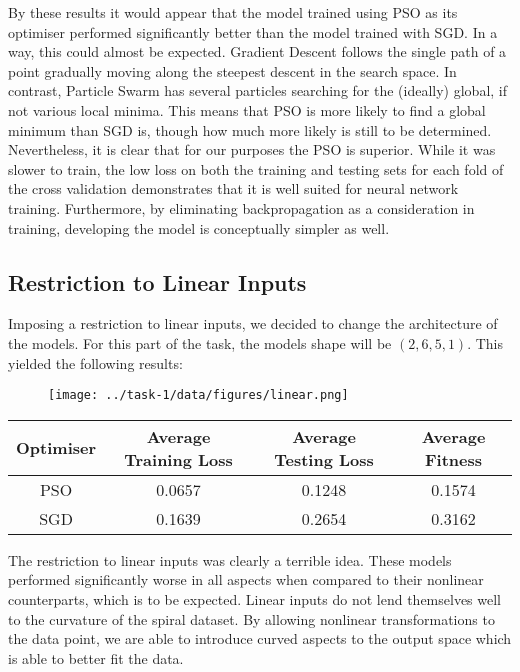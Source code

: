 \documentclass[12pt]{article}
\begin{document}
By these results it would appear that the model trained using PSO as its optimiser performed significantly better than the model trained with SGD. 
In a way, this could almost be expected. Gradient Descent follows the single path of a point gradually moving along the steepest descent in the search space.
In contrast, Particle Swarm has several particles searching for the (ideally) global, if not various local minima. 
This means that PSO is more likely to find a global minimum than SGD is, though how much more likely is still to be determined.
Nevertheless, it is clear that for our purposes the PSO is superior. 
While it was slower to train, the low loss on both the training and testing sets for each fold of the cross validation demonstrates that it is well suited for neural network training. Furthermore, by eliminating backpropagation as a consideration in training, developing the model is conceptually simpler as well. 
\subsection{Restriction to Linear Inputs}
Imposing a restriction to linear inputs, we decided to change the architecture of the models. 
For this part of the task, the models shape will be $(2, 6, 5, 1)$.
This yielded the following results:
\begin{figure}[h]                   
      \begin{center}                  
          \texttt{[image: ../task-1/data/figures/linear.png]}    
      \end{center}                                                                                              
\end{figure}
\begin{center}
 \begin{tabular}{||c c c c||} 
 \hline
 Optimiser & Average Training Loss & Average Testing Loss & Average Fitness \\ [0.5ex] 
 \hline\hline
 PSO & 0.0657 & 0.1248 & 0.1574 \\ 
 \hline
 SGD & 0.1639 & 0.2654 & 0.3162 \\
 \hline
\end{tabular}
\end{center}

The restriction to linear inputs was clearly a terrible idea.
These models performed significantly worse in all aspects when compared to their nonlinear counterparts, which is to be expected. Linear inputs do not lend themselves well to the curvature of the spiral dataset. 
By allowing nonlinear transformations to the data point, we are able to introduce curved aspects to the output space which is able to better fit the data.  
\end{document}
